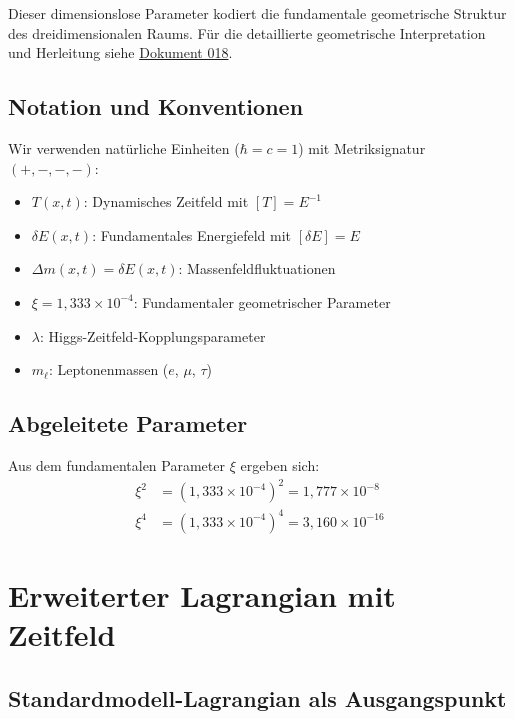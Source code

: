 	Dieser dimensionslose Parameter kodiert die fundamentale geometrische Struktur des dreidimensionalen Raums. Für die detaillierte geometrische Interpretation und Herleitung siehe \href{https://github.com/jpascher/T0-Time-Mass-Duality/blob/main/2/pdf/018_T0_Anomale-g2-10_De.pdf}{Dokument 018}.
	
	\subsection{Notation und Konventionen}
	
	Wir verwenden natürliche Einheiten ($\hbar = c = 1$) mit Metriksignatur $(+,-,-,-)$:
	
	\begin{itemize}
		\item $T(x,t)$: Dynamisches Zeitfeld mit $[T] = E^{-1}$
		\item $\delta E(x,t)$: Fundamentales Energiefeld mit $[\delta E] = E$
		\item $\Delta m(x,t) = \delta E(x,t)$: Massenfeldfluktuationen
		\item $\xi = 1{,}333 \times 10^{-4}$: Fundamentaler geometrischer Parameter
		\item $\lambda$: Higgs-Zeitfeld-Kopplungsparameter
		\item $m_\ell$: Leptonenmassen ($e$, $\mu$, $\tau$)
	\end{itemize}
	
	\subsection{Abgeleitete Parameter}
	
	Aus dem fundamentalen Parameter $\xi$ ergeben sich:
	\begin{align}
		\xi^2 &= \left(1{,}333 \times 10^{-4}\right)^2 = 1{,}777 \times 10^{-8} \label{eq:xi_squared} \\
		\xi^4 &= \left(1{,}333 \times 10^{-4}\right)^4 = 3{,}160 \times 10^{-16} \label{eq:xi_fourth}
	\end{align}
	
	\section{Erweiterter Lagrangian mit Zeitfeld}
	
	\subsection{Standardmodell-Lagrangian als Ausgangspunkt}
	
